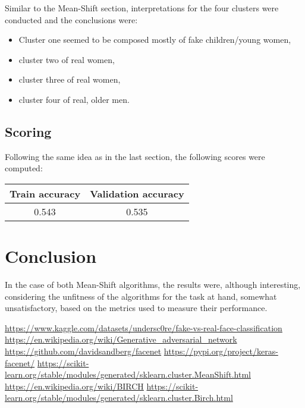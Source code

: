 \documentclass{article}
\begin{document}
Similar to the Mean-Shift section, interpretations for the four clusters were conducted and the conclusions were:

\begin{itemize}
	\item Cluster one seemed to be composed mostly of fake children/young women,
	\item cluster two of real women,
	\item cluster three of real women,
	\item cluster four of real, older men.
\end{itemize}

\subsection{Scoring}
Following the same idea as in the last section, the following scores were computed:

\begin{center}
\begin{tabular}{||c|c||} 
 \hline
 Train accuracy & Validation accuracy \\
 \hline\hline
 0.543 & 0.535 \\
 \hline
\end{tabular}
\end{center}

\section{Conclusion}
In the case of both Mean-Shift algorithms, the results were, although interesting, considering the unfitness of the algorithms for the task at hand, somewhat unsatisfactory, based on the metrics used to measure their performance.

\newpage



\begin{thebibliography}{1.7} 
	\url{https://www.kaggle.com/datasets/undersc0re/fake-vs-real-face-classification}
	\url{https://en.wikipedia.org/wiki/Generative_adversarial_network}
	\url{https://github.com/davidsandberg/facenet}
	\url{https://pypi.org/project/keras-facenet/}
	\url{https://scikit-learn.org/stable/modules/generated/sklearn.cluster.MeanShift.html}
	\url{https://en.wikipedia.org/wiki/BIRCH}
	\url{https://scikit-learn.org/stable/modules/generated/sklearn.cluster.Birch.html}
\end{thebibliography}
\end{document}
